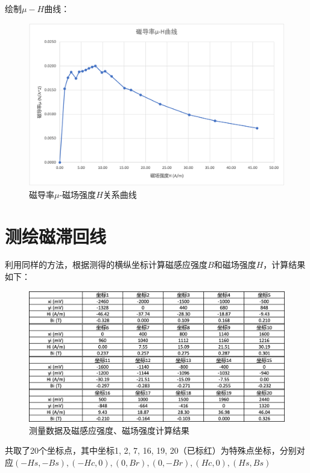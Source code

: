 \documentclass{article}
\begin{document}
绘制$\mu - H$曲线：
\begin{figure}[htbp]
    \centering
    \includegraphics[width=1.0\textwidth]{plot2.png}
    \caption{磁导率$\mu$-磁场强度$H$关系曲线}
\end{figure}

\newpage

\section{测绘磁滞回线}
利用同样的方法，根据测得的横纵坐标计算磁感应强度$B$和磁场强度$H$，计算结果如下：

\begin{figure}[htbp]
    \centering
    \includegraphics[width=1.0\textwidth]{data2.png}
    \caption{测量数据及磁感应强度、磁场强度计算结果}
\end{figure}

共取了20个坐标点，其中坐标1, 2, 7, 16, 19, 20（已标红）为特殊点坐标，分别对应$(-Hs, -Bs), (-Hc, 0), (0, Br), (0, -Br), (Hc, 0), (Hs, Bs)$
\end{document}
